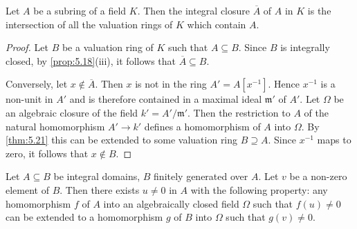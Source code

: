 \begin{corollary}\label{cor:5.22}
Let $A$ be a subring of a field $K$. Then the integral closure $\overline{A}$ of $A$ in $K$ is the intersection of all the valuation rings of $K$ which contain $A$.
\end{corollary}

\begin{proof}
Let $B$ be a valuation ring of $K$ such that $A \subseteq B$. Since $B$ is integrally closed, by \eqref{prop:5.18}(iii), it follows that $\overline{A} \subseteq B$.

Conversely, let $x \notin \overline{A}$. Then $x$ is not in the ring $A' = A[x^{-1}]$. Hence $x^{-1}$ is a non-unit in $A'$ and is therefore contained in a maximal ideal $\mathfrak{m}'$ of $A'$. Let $\Omega$ be an algebraic closure of the field $k' = A'/\mathfrak{m}'$. Then the restriction to $A$ of the natural homomorphism $A' \to k'$ defines a homomorphism of $A$ into $\Omega$. By \eqref{thm:5.21} this can be extended to some valuation ring $B \supseteq A$. Since $x^{-1}$ maps to zero, it follows that $x \notin B$.
\end{proof}

\begin{proposition}\label{prop:5.23}
Let $A \subseteq B$ be integral domains, $B$ finitely generated over $A$. Let $v$ be a non-zero element of $B$. Then there exists $u \neq 0$ in $A$ with the following property: any homomorphism $f$ of $A$ into an algebraically closed field $\Omega$ such that $f(u) \neq 0$ can be extended to a homomorphism $g$ of $B$ into $\Omega$ such that $g(v) \neq 0$.
\end{proposition}


